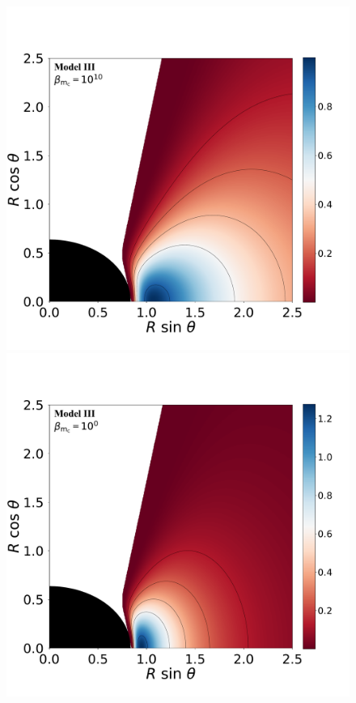 \documentclass[twocolumn,aps,showpacs,showkeys,prd,superscriptaddress,byrevtex, amsmath]{revtex4-1}
\begin{document}
\begin{figure}
\\
\includegraphics[scale=0.14]{figures/fig3_III_10.pdf}
\hspace{-0.3cm}
\includegraphics[scale=0.14]{figures/fig3_III_1.pdf}

\end{figure}
\end{document}
